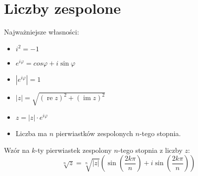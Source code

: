\section*{Liczby zespolone}

Najważniejsze własności:

\begin{itemize}
    \item $i^2 = -1$
    \item $e^{i\varphi} = cos{\varphi} + i\sin{\varphi}$
    \item $|e^{i\varphi}| = 1$
    \item $|z| = \sqrt{(\operatorname{re}{z})^2 +
    (\operatorname{im}{z})^2}$
    \item $z = |z|\cdot e^{i\varphi}$
    \item Liczba ma $n$ pierwiastków zespolonych $n$-tego stopnia.
\end{itemize}
Wzór na $k$-ty pierwiastek zespolony $n$-tego stopnia z liczby $z$:
\begin{equation*}
    \sqrt[n]{z} = \sqrt[n]{|z|}
    \left(
    \sin{\left(\frac{2k\pi}{n}\right)}
    + i\sin{\left(\frac{2k\pi}{n}\right)}
    \right)
\end{equation*}